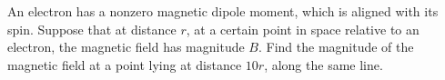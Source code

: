An electron has a nonzero magnetic dipole moment, which is aligned
with its spin. Suppose that at distance $r$, at a certain point
in space relative to an electron, the magnetic field has magnitude
$B$. Find the magnitude of the magnetic field at a point
lying at distance $10r$, along the same line.\answercheck
